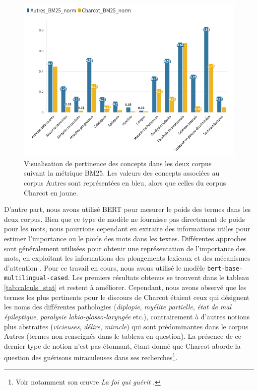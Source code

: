 \begin{figure}[!h]
    \centering
    \includegraphics[width=1\textwidth]{img/Charcot_Autres_250523.png}
    \caption{Visualisation de pertinence des concepts dans les deux corpus suivant la métrique \textsc{BM25}. Les valeurs des concepts associées au corpus \og{}Autres\fg{} sont représentées en bleu, alors que celles du corpus \og{}Charcot\fg{} en jaune.}
    \label{fig:bm25}
\end{figure}

D'autre part, nous avons utilisé \textsc{BERT} pour mesurer le poids des termes dans les deux corpus. Bien que ce type de modèle ne fournisse pas directement de poids pour les mots, nous pourrions cependant en extraire des informations utiles pour estimer l'importance ou le poids des mots dans les textes. Différentes approches sont généralement utilisées pour obtenir une représentation de l'importance des mots, en exploitant les informations des plongements lexicaux et des mécanismes d'attention \citep{vaswani2023}. Pour ce travail en cours, nous avons utilisé le modèle \texttt{bert-base-multilingual-cased}. Les premiers résultats obtenus se trouvent dans le tableau \ref{tab:calculs_stat} et restent à améliorer. Cependant, nous avons observé que les termes les plus pertinents pour le discours de Charcot étaient ceux qui désignent les noms des différentes pathologies (\textit{diplopie}, \textit{myélite partielle}, \textit{état de mal épileptique}, \textit{paralysie labio-glosso-laryngée} etc.), contrairement à d'autres notions plus abstraites (\textit{vicieuses}, \textit{délire}, \textit{miracle}) qui sont prédominantes dans le corpus
\og{}Autres\fg{} (termes non renseignés dans le tableau en question). La présence de ce dernier type de notion n'est pas étonnant, étant donné que Charcot aborde la question des guérisons miraculeuses dans ses recherches\footnote{Voir notamment son \oe{}uvre \textit{La foi qui guérit} \citep{charcot1897foi}.}. 



